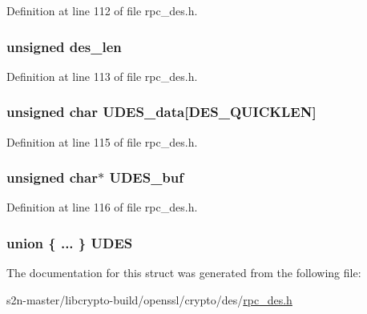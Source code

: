 Definition at line 112 of file rpc\+\_\+des.\+h.

\subsubsection[{\texorpdfstring{des\+\_\+len}{des_len}}]{\setlength{\rightskip}{0pt plus 5cm}unsigned des\+\_\+len}\hypertarget{structdesparams_a11021626f64bb1cdb2fe8bec37fd61bd}{}\label{structdesparams_a11021626f64bb1cdb2fe8bec37fd61bd}


Definition at line 113 of file rpc\+\_\+des.\+h.

\subsubsection[{\texorpdfstring{U\+D\+E\+S\+\_\+data}{UDES_data}}]{\setlength{\rightskip}{0pt plus 5cm}unsigned char U\+D\+E\+S\+\_\+data\mbox{[}{\bf D\+E\+S\+\_\+\+Q\+U\+I\+C\+K\+L\+EN}\mbox{]}}\hypertarget{structdesparams_a434f6db8007a05ed486b30550acd2307}{}\label{structdesparams_a434f6db8007a05ed486b30550acd2307}


Definition at line 115 of file rpc\+\_\+des.\+h.

\subsubsection[{\texorpdfstring{U\+D\+E\+S\+\_\+buf}{UDES_buf}}]{\setlength{\rightskip}{0pt plus 5cm}unsigned char$\ast$ U\+D\+E\+S\+\_\+buf}\hypertarget{structdesparams_afe6b6b5fd0016c0a54f39ce7aa410b64}{}\label{structdesparams_afe6b6b5fd0016c0a54f39ce7aa410b64}


Definition at line 116 of file rpc\+\_\+des.\+h.

\subsubsection[{\texorpdfstring{U\+D\+ES}{UDES}}]{\setlength{\rightskip}{0pt plus 5cm}union \{ ... \}   U\+D\+ES}\hypertarget{structdesparams_a08f6caaf21d2d5f365580db69f6f184c}{}\label{structdesparams_a08f6caaf21d2d5f365580db69f6f184c}


The documentation for this struct was generated from the following file\+:\begin{DoxyCompactItemize}
\item 
s2n-\/master/libcrypto-\/build/openssl/crypto/des/\hyperlink{rpc__des_8h}{rpc\+\_\+des.\+h}\end{DoxyCompactItemize}
